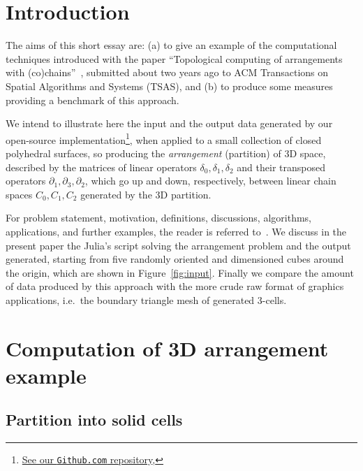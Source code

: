 \documentclass[11pt, oneside]{amsart}   	%
\begin{document}
\section{Introduction}
The aims of this short essay are:  (a) to give an example of the computational techniques introduced with the paper ``Topological computing of arrangements with (co)chains''~\cite{TSAS}, submitted about two years ago to ACM Transactions on Spatial Algorithms and Systems (TSAS), and (b) to produce some  measures providing a benchmark of this approach. 
\newpage

We intend to illustrate here the input and the output data generated by our open-source  implementation\footnote{{\footnotesize
\href{https://github.com/cvdlab/LinearAlgebraicRepresentation.jl/tree/julia-1.0}{See our \texttt{Github.com} repository},
}}, when applied to a small collection of closed polyhedral surfaces, so producing the \emph{arrangement} (partition) of 3D space, described by the matrices of linear operators $\delta_0, \delta_1, \delta_2$ and their transposed operators $\partial_1, \partial_3, \partial_2$, which go up and down, respectively, between linear chain spaces $C_0, C_1, C_2$ generated by the 3D partition.

For problem statement, motivation, definitions, discussions, algorithms, applications, and further examples, the reader is  referred to~\cite{TSAS}.
We discuss in the present paper the Julia's script solving the arrangement problem and the output generated, starting from five randomly oriented and dimensioned cubes around the origin, which are shown in Figure~\ref{fig:input}. Finally we compare the amount of data produced by this approach with the more crude raw format of graphics applications, i.e.~the boundary triangle mesh of generated 3-cells. 



\section{Computation of 3D arrangement example}

\subsection{Partition into solid cells}
\end{document}
